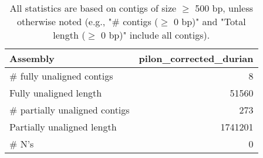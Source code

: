 \documentclass[12pt,a4paper]{article}
\begin{document}
\begin{table}[ht]
\begin{center}
\caption{All statistics are based on contigs of size $\geq$ 500 bp, unless otherwise noted (e.g., "\# contigs ($\geq$ 0 bp)" and "Total length ($\geq$ 0 bp)" include all contigs).}
\begin{tabular}{|l*{1}{|r}|}
\hline
Assembly & pilon\_corrected\_durian \\ \hline
\# fully unaligned contigs & 8 \\ \hline
Fully unaligned length & 51560 \\ \hline
\# partially unaligned contigs & 273 \\ \hline
Partially unaligned length & 1741201 \\ \hline
\# N's & 0 \\ \hline
\end{tabular}
\end{center}
\end{table}
\end{document}
